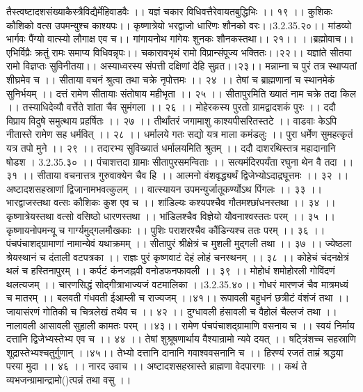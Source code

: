 तैस्त्वष्टादशसंख्याकैस्त्रैविद्यैर्मेहिवाडवैः ।।
यज्ञं चकार विधिवत्तैरेवायतबुद्धिभिः ।। १९ ।।
कुशिकः कौशिको वत्स उपमन्युश्च काश्यपः।।
कृष्णात्रेयो भरद्वाजो धारिणः शौनको वरः।।3.2.35.२०।।
मांडव्यो भार्गवः पैंग्यो वात्स्यो लौगाक्ष एव च।।
गांगायनोथ गांगेयः शुनकः शौनकस्तथा।। २१।।
।।ब्रह्मोवाच।।
एभिर्विप्रैः क्रतुं रामः समाप्य विधिवन्नृपः।।
चकारावभृथं रामो विप्रान्संपूज्य भक्तितः।।२२।।
यज्ञांते सीतया रामो विज्ञप्तः सुविनीतया।।
अस्याध्वरस्य संपत्ती दक्षिणां देहि सुव्रत।।२३।।
मन्नाम्ना च पुरं तत्र स्थाप्यतां शीघ्रमेव च ।।
सीताया वचनं श्रुत्वा तथा चक्रे नृपोत्तमः ।। २४ ।।
तेषां च ब्राह्मणानां च स्थानमेकं सुनिर्भयम् ।।
दत्तं रामेण सीतायाः संतोषाय महीभृता ।। २५ ।।
सीतापुरमिति ख्यातं नाम चक्रे तदा किल ।।
तस्याधिदेव्यौ वर्त्तेते शांता चैव सुमंगला ।। २६ ।।
मोहेरकस्य पुरतो ग्रामद्वादशकं पुरः ।।
ददौ विप्राय विदुषे समुत्थाय प्रहर्षितः ।। २७ ।।
तीर्थांतरं जगामाशु काश्यपीसरितस्तटे ।।
वाडवाः केऽपि नीतास्ते रामेण सह धर्मवित् ।। २८ ।।
धर्मालये गतः सद्यो यत्र माला कमंडलुः ।।
पुरा धर्मेण सुमहत्कृतं यत्र तपो मुने ।। २९ ।।
तदारभ्य सुविख्यातं धर्मालयमिति
श्रुतम् ।। ददौ दाशरथिस्तत्र महादानानि षोडश । 3.2.35.३० ।।
पंचाशत्तदा ग्रामाः सीतापुरसमन्विताः ।।
सत्यमंदिरपर्यंता रघुना थेन वै तदा ।। ३१ ।।
सीताया वचनात्तत्र गुरुवाक्येन चैव हि ।।
आत्मनो वंशवृद्ध्यर्थं द्विजेभ्योऽदाद्रघूत्तमः ।। ३२ ।।
अष्टादशसहस्राणां द्विजानामभवत्कुलम् ।।
वात्स्यायन उपमन्युर्जातूकर्ण्योऽथ पिंगलः ।। ३३ ।।
भारद्वाजस्तथा वत्सः कौशिकः कुश एव च ।।
शांडिल्यः कश्यपश्चैव गौतमश्छांधनस्तथा ।। ३४ ।।
कृष्णात्रेयस्तथा वत्सो वसिष्ठो धारणस्तथा ।।
भांडिलश्चैव विज्ञेयो यौवनाश्वस्ततः परम् ।। ३५ ।।
कृष्णायनोपमन्यू च गार्ग्यमुद्गलमौखकाः ।।
पुशिः पराशरश्चैव कौंडिन्यश्च ततः परम् ।। ३६ ।।
पंचपंचाशद्ग्रामाणां नामान्येवं यथाक्रमम् ।।
सीतापुरं श्रीक्षेत्रं च मुशली मुद्गली तथा ।। ३७ ।।
ज्येष्ठला श्रेयस्थानं च दंताली वटपत्रका ।।
राज्ञः पुरं कृष्णवाटं देहं लोहं चनस्थनम् ।। ३८ ।।
कोहेचं चंदनक्षेत्रं थलं च हस्तिनापुरम् ।।
कर्पटं कंनजह्नवी वनोडफनफावली ।। ३९ ।।
मोहोधं शमोहोरली गोविंदणं थलत्यजम् ।।
चारणसिद्धं सोद्गीत्राभाज्यजं वटमालिका ।।3.2.35.४०।।
गोधरं मारणजं चैव मात्रमध्यं च मातरम् ।।
बलवती गंधवती ईआम्ली च राज्यजम् ।।४१।।
रूपावली बहुधनं छत्रीटं वंशंजं तथा ।।
जायासंरणं गोतिकी च चित्रलेखं तथैव च ।। ४२ ।।
दुग्धावली हंसावली च वैहोलं चैल्लजं तथा ।।
नालावली आसावली सुहाली कामतः परम् ।।४३।।
रामेण पंचपंचाशद्ग्रामाणि वसनाय च ।।
स्वयं निर्माय दत्तानि द्विजेभ्यस्तेभ्य एव च ।। ४४ ।।
तेषां शुश्रूषणार्थाय वैश्यान्रामो न्यवे दयत् ।।
षट्त्रिंशच्च सहस्राणि शूद्रास्तेभ्यश्चतुर्गुणान् ।।४५।।
तेभ्यो दत्तानि दानानि गवाश्ववसनानि च ।।
हिरण्यं रजतं ताम्रं श्रद्धया परया मुदा ।। ४६ ।।
नारद उवाच ।।
अष्टादशसहस्रास्ते ब्राह्मणा वेदपारगाः ।।
कथं ते व्यभजन्ग्रामान्द्रामो()त्पन्नं तथा वसु ।।
